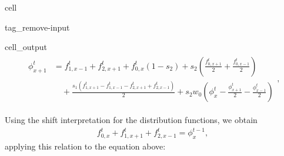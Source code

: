 \documentclass[letterpaper,10pt,english,openany,oneside]{jupyterBook}
\begin{document}
\begin{sphinxuseclass}{cell}
\begin{sphinxuseclass}{tag_remove-input}\begin{sphinxVerbatimOutput}

\begin{sphinxuseclass}{cell_output}\begin{equation*}
\begin{split}\displaystyle \begin{aligned}\phi_{x+1}^t &= f_{1,x-1}^{t} + f_{2,x+1}^{t} + f_{0,x}^{t} \left(1 - s_{2}\right) + s_{2} \left(\frac{f_{0,x+1}^{t}}{2} + \frac{f_{0,x-1}^{t}}{2}\right) \\ &\quad + \frac{s_{1} \left(f_{1,x+1}^{t} - f_{1,x-1}^{t} - f_{2,x+1}^{t} + f_{2,x-1}^{t}\right)}{2} + s_{2} w_{0} \left(\phi^{t}_{x} - \frac{\phi_{x+1}^t}{2} - \frac{\phi_{x-1}^t}{2}\right)\end{aligned},\end{split}
\end{equation*}
\end{sphinxuseclass}\end{sphinxVerbatimOutput}

\end{sphinxuseclass}
\end{sphinxuseclass}
\sphinxAtStartPar
Using the shift interpretation for the distribution functions, we obtain
\begin{equation}\label{equation:Refs/LBM-Study/FDM-Belloti/FDM-LBM-Diffusive:rel-f-1}
\begin{split}
f_{0,x}^{t}+f_{1,x+1}^{t}+f_{2,x-1}^{t}=\phi^{t-1}_{x},
\end{split}
\end{equation}
\sphinxAtStartPar
applying this relation to the equation above:
\end{document}
